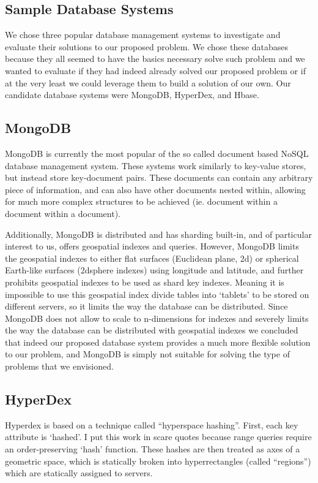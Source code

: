 \documentclass[11pt]{article}
\begin{document}
\subsection{Sample Database Systems}

We chose three popular database management systems to investigate and evaluate their solutions to our proposed problem. We chose these databases because they all seemed to have the basics necessary solve such problem and we wanted to evaluate if they had indeed already solved our proposed problem or if at the very least we could leverage them to build a solution of our own. Our candidate database systems were MongoDB, HyperDex, and Hbase.

\subsection{MongoDB}

MongoDB is currently the most popular of the so called document based NoSQL database management system. These systems work similarly to key-value stores, but instead store key-document pairs. These documents can contain any arbitrary piece of information, and can also have other documents nested within, allowing for much more complex structures to be achieved (ie. document within a document within a document). 

Additionally, MongoDB is distributed and has sharding built-in, and of particular interest to us, offers geospatial indexes and queries. However, MongoDB limits the geospatial indexes to either flat surfaces (Euclidean plane, 2d) or spherical Earth-like surfaces (2dsphere indexes) using longitude and latitude, and further prohibits geospatial indexes to be used as shard key indexes. Meaning it is impossible to use this geospatial index divide tables into `tablets' to be stored on different servers, so it limits the way the database can be distributed. Since MongoDB does not allow to scale to n-dimensions for indexes and severely limits the way the database can be distributed with geospatial indexes we concluded that indeed our proposed database system provides a much more flexible solution to our problem, and MongoDB is simply not suitable for solving the type of problems that we envisioned.

\subsection{HyperDex}

Hyperdex is based on a technique called ``hyperspace hashing''. First, each key attribute is `hashed'. I put this work in scare quotes because range queries require an order-preserving `hash' function. These hashes are then treated as axes of a geometric space, which is statically broken into hyperrectangles (called ``regions'') which are statically assigned to servers.
\end{document}
